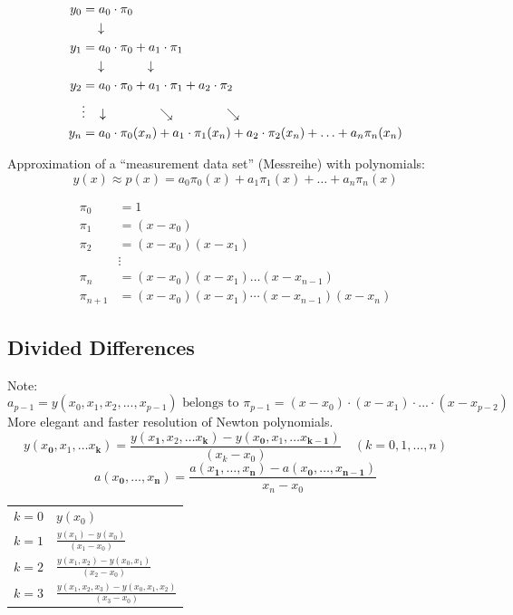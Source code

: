 \begin{minipage}[t]{7.5cm}
	\begin{align}
		y_0 &= a_0\cdot \pi_0 \nonumber\\
		&\quad \downarrow\nonumber\\
		y_1 &= a_0\cdot \pi_0 +a_1\cdot\pi_1 \nonumber\\
		&\quad \downarrow \hspace{1.2cm}\downarrow\nonumber\\
		y_2 &= a_0\cdot \pi_0 +a_1\cdot\pi_1  +a_2\cdot\pi_2  \nonumber\\
		&\vdots\hspace{0.3cm}\downarrow \hspace{1.5cm}\searrow\hspace{1.5cm}\searrow\nonumber\\
		y_n &= a_0\cdot \pi_0(x_n) +a_1\cdot\pi_1(x_n)  +a_2\cdot\pi_2(x_n)+\ldots+ a_n\pi_n(x_n) \nonumber
	\end{align}

	Approximation of a ``measurement data set'' (Messreihe) with polynomials: $$y(x)\approx p(x) = a_0 \pi_0(x) + a_1 \pi_1(x) + \ldots+ a_{n} \pi_{n}(x)$$
\end{minipage}
\hfill
\begin{minipage}[t]{11.5cm}
	\begin{align}
		\pi_0 &= 1 \nonumber\\
		\pi_1 &= (x-x_0) \nonumber\\
		\pi_2 &= (x-x_0)(x-x_1) \nonumber\\
		&\vdots \nonumber\\
		\pi_n &= (x-x_0)(x-x_1)\ldots(x-x_{n-1}) \nonumber\\
		\pi_{n+1} &= (x-x_0)(x-x_1)\cdots(x-x_{n-1})(x-x_n) \nonumber
	\end{align}
\end{minipage}

\subsection{Divided Differences}
Note:
\[
	a_{p-1} = y(x_0,x_1,x_2, ... , x_{p-1}) \text{ belongs to } \pi_{p-1}=(x-x_0)\cdot(x-x_1)\cdot ... \cdot (x-x_{p-2})
\]
More elegant and faster resolution of Newton polynomials.
$$y(x_\mathbf{0}, x_1, \ldots x_\mathbf{k}) = \frac{y(x_\mathbf{1},x_2,\ldots x_\mathbf{k})-y(x_\mathbf{0},x_1,\ldots x_{\mathbf{k-1}})}{(x_k-x_0)} \quad (k=0,1,\ldots,n)$$
$$a(x_\mathbf{0},\ldots,x_\mathbf{n})=\frac{a(x_\mathbf{1},\ldots,x_\mathbf{n})-a(x_\mathbf{0},\ldots,x_{\mathbf{n-1}})}{x_n-x_0}$$
\begin{tabular}{ll}
$k=0$ &$y(x_0)$ \\[0.2cm]
$k=1$ &$\frac{y(x_1)-y(x_0)}{(x_1-x_0)}$\\[0.2cm]
$k=2$ &$\frac{y(x_1,x_2)-y(x_0,x_1)}{(x_2-x_0)}$\\[0.2cm]
$k=3$ &$\frac{y(x_1,x_2,x_3)-y(x_0,x_1,x_2)}{(x_3-x_0)}$\\
\end{tabular}\\
\\

